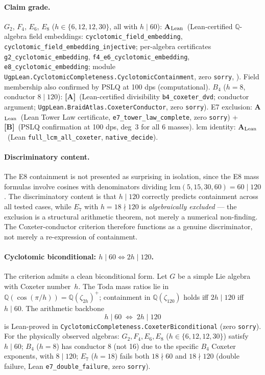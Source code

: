 \documentclass[11pt]{article}
\theoremstyle{remark}
\newcommand{\zetaN}[1]{\zeta_{#1}}
\begin{document}
\paragraph{Claim grade.}
\begin{sloppypar}
$G_2$, $F_4$, $E_6$, $E_8$ ($h \in \{6,12,12,30\}$, all with $h \mid 60$):
\textbf{A$_{\rm Lean}$}\ (Lean-certified $\mathbb{Q}$-algebra field embeddings:
\texttt{cyclotomic\_field\_embedding}, \texttt{cyclotomic\_field\_embedding\_injective};
per-algebra certificates \texttt{g2\_cyclotomic\_embedding},
\texttt{f4\_e6\_cyclotomic\_embedding}, \texttt{e8\_cyclotomic\_embedding};
module \texttt{UgpLean.CyclotomicCompleteness.CyclotomicContainment},
zero \texttt{sorry}, \cite{ugp-lean}).
Field membership also confirmed by PSLQ at 100 dps (computational).
$B_4$ ($h=8$, conductor $8 \mid 120$): \textbf{[A]}\ (Lean-certified divisibility
\texttt{b4\_coxeter\_dvd}; conductor argument;
\texttt{UgpLean.BraidAtlas.CoxeterConductor}, zero \texttt{sorry}).
E7 exclusion: \textbf{A$_{\rm Lean}$}\ (Lean Tower Law certificate,
\texttt{e7\_tower\_law\_complete}, zero \texttt{sorry}) + \textbf{[B]}\ (PSLQ
confirmation at 100 dps, deg~3 for all 6 masses).
lcm identity: \textbf{A$_{\rm Lean}$}\ (Lean \texttt{full\_lcm\_all\_coxeter},
\texttt{native\_decide}).
\end{sloppypar}

\paragraph{Discriminatory content.}
The E8 containment is not presented as surprising in isolation, since the E8 mass formulas involve cosines with denominators dividing $\mathrm{lcm}(5,15,30,60) = 60 \mid 120$.  The discriminatory content is that $h \mid 120$ correctly predicts containment across all tested cases, while $E_7$ with $h = 18 \nmid 120$ is \emph{algebraically excluded} — the exclusion is a structural arithmetic theorem, not merely a numerical non-finding.  The Coxeter-conductor criterion therefore functions as a genuine discriminator, not merely a re-expression of containment.

\paragraph{Cyclotomic biconditional: $h \mid 60 \Leftrightarrow 2h \mid 120$.}
The criterion admits a clean biconditional form.  Let $G$ be a simple Lie algebra with Coxeter number~$h$.  The Toda mass ratios lie in $\mathbb{Q}(\cos(\pi/h)) = \mathbb{Q}(\zeta_{2h})^+$; containment in $\mathbb{Q}(\zetaN{120})$ holds iff $2h \mid 120$ iff $h \mid 60$.  The arithmetic backbone
\[
  h \mid 60 \;\Longleftrightarrow\; 2h \mid 120
\]
is Lean-proved in \texttt{CyclotomicCompleteness.CoxeterBiconditional} (zero \texttt{sorry}).  For the physically observed algebras:
$G_2,F_4,E_6,E_8$ ($h \in \{6,12,12,30\}$) satisfy $h \mid 60$;
$B_4$ ($h=8$) has conductor 8 (not 16) due to the specific $B_4$ Coxeter exponents,
with $8 \mid 120$; $E_7$ ($h=18$) fails both $18\nmid 60$ and $18\nmid 120$
(double failure, Lean \texttt{e7\_double\_failure}, zero \texttt{sorry}).
\end{document}
